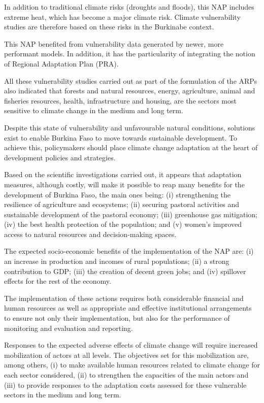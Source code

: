 \documentclass[
]{book}
\begin{document}
In addition to traditional climate risks (droughts and floods), this NAP includes extreme heat, which has become a major climate risk. Climate vulnerability studies are therefore based on these risks in the Burkinabe context.

This NAP benefited from vulnerability data generated by newer, more performant models. In addition, it has the particularity of integrating the notion of Regional Adaptation Plan (PRA).

All these vulnerability studies carried out as part of the formulation of the ARPs also indicated that forests and natural resources, energy, agriculture, animal and fisheries resources, health, infrastructure and housing, are the sectors most sensitive to climate change in the medium and long term.

Despite this state of vulnerability and unfavourable natural conditions, solutions exist to enable Burkina Faso to move towards sustainable development. To achieve this, policymakers should place climate change adaptation at the heart of development policies and strategies.

Based on the scientific investigations carried out, it appears that adaptation measures, although costly, will make it possible to reap many benefits for the development of Burkina Faso, the main ones being: (i) strengthening the resilience of agriculture and ecosystems; (ii) securing pastoral activities and sustainable development of the pastoral economy; (iii) greenhouse gas mitigation; (iv) the best health protection of the population; and (v) women's improved access to natural resources and decision-making spaces.

The expected socio-economic benefits of the implementation of the NAP are: (i) an increase in production and incomes of rural populations; (ii) a strong contribution to GDP; (iii) the creation of decent green jobs; and (iv) spillover effects for the rest of the economy.

The implementation of these actions requires both considerable financial and human resources as well as appropriate and effective institutional arrangements to ensure not only their implementation, but also for the performance of monitoring and evaluation and reporting.

Responses to the expected adverse effects of climate change will require increased mobilization of actors at all levels. The objectives set for this mobilization are, among others, (i) to make available human resources related to climate change for each sector considered, (ii) to strengthen the capacities of the main actors and (iii) to provide responses to the adaptation costs assessed for these vulnerable sectors in the medium and long term.
\end{document}
